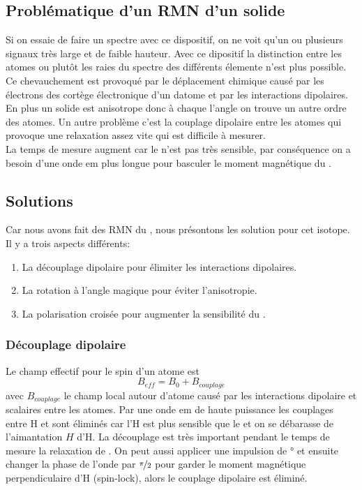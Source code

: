 \documentclass[a4paper,12pt]{scrartcl}
\begin{document}
  \subsection{Problématique d'un RMN d'un solide}
   Si on essaie de faire un spectre avec ce dispositif, on ne voit qu'un ou plusieurs signaux très large et de faible hauteur. Avec ce dipositif la distinction entre les atomes ou plutôt les raies du spectre des différents élemente n'est plus possible. Ce chevauchement est provoqué par le déplacement chimique causé par les électrons des cortège électronique d'un datome et par les interactions dipolaires. En plus un solide est anisotrope donc à chaque l'angle on trouve un autre ordre des atomes. Un autre problème c'est la couplage dipolaire entre les atomes qui provoque une relaxation assez vite qui est difficile à mesurer.\\
   La temps de mesure augment car le  n'est pas très sensible, par conséquence on a besoin d'une onde em plus longue pour basculer le moment magnétique du .

  \subsection{Solutions}
   Car nous avons fait des RMN du , nous présontons les solution pour cet isotope. Il y a trois aspects différents:
   \begin{enumerate}
    \item La découplage dipolaire pour élimiter les interactions dipolaires.
    \item La rotation à l'angle magique pour éviter l'anisotropie.
    \item La polarisation croisée pour augmenter la sensibilité du .
   \end{enumerate}

   \subsubsection{Découplage dipolaire}
    Le champ effectif pour le spin d'un atome est
    \begin{equation*}
     B_{eff}=B_0 + B_{couplage} 
    \end{equation*}
    avec $B_{couplage}$ le champ local autour d'atome causé par les interactions dipolaire et scalaires entre les atomes. Par une onde em de haute puissance les couplages entre H et  sont éliminés car l'H est plus sensible que le  et on se  débarasse de l'aimantation $H$ d'H. La découplage est très important pendant le temps de mesure la relaxation de . On peut aussi applicer une impulsion de \unit[90]{\degree} et ensuite changer la phase de l'onde par $\nicefrac{\pi}{2}$ pour garder le moment magnétique perpendiculaire d'H (spin-lock), alors le couplage dipolaire est éliminé. 
\end{document}
